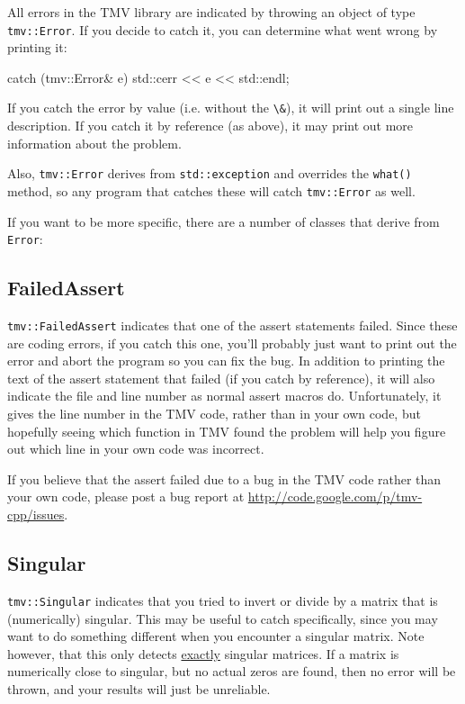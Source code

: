 \documentclass[twoside,letterpaper,11pt]{article}
\newcommand{\myissuesx}{http://code.google.com/p/tmv-cpp/issues}
\newcommand{\myissues}{\url{\myissuesx}}
\renewcommand{\tt}[1]{{\lstinline {#1}}}
\begin{document}
All errors in the TMV library are indicated by throwing an object of type
\tt{tmv::Error}.  If you decide to catch it, you can determine what went
wrong by printing it:
\begin{tmvcode}
catch (tmv::Error& e) {
  std::cerr << e << std::endl;
}
\end{tmvcode}
If you catch the error by value (i.e. without the \tt{\&}), it will print out
a single line description.  If you catch it by reference (as above), it may 
print out more information about the problem.

Also, \tt{tmv::Error} derives from \tt{std::exception} and overrides the \tt{what()}
method, so any program that catches these will catch \tt{tmv::Error} as well.

If you want to be more specific, there are a number of classes that derive from
\tt{Error}:

\subsection{FailedAssert}
\label{FailedAssert}

\tt{tmv::FailedAssert} indicates that one of the assert statements failed.
Since these are coding errors,
if you catch this one, you'll probably just want to print out the error and abort
the program so you can fix the bug.  In addition to printing the text of the
assert statement that failed (if you catch by reference), it will also indicate
the file and line number as normal assert macros do.  Unfortunately, it gives the 
line number in the TMV code, rather than in your own code, but hopefully seeing
which function in TMV found the problem will help you figure out which line
in your own code was incorrect.

If you believe that the assert failed due to a bug in the TMV code
rather than your own code, please post a bug report at \myissues.

\subsection{Singular}
\label{Singular}

\tt{tmv::Singular} indicates that you tried to invert or divide by a matrix
that is (numerically) singular.  This may be useful to catch specifically,
since you may want to do something different when you encounter a singular
matrix.  Note however, that this only detects \underline{exactly} singular
matrices.  If a matrix is numerically close to singular, but no actual 
zeros are found, then no error will be thrown, and your results will just be 
unreliable.
\end{document}
